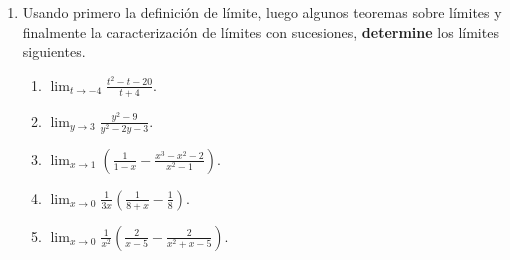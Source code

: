 \documentclass[12pt]{article}
\begin{document}
\begin{enumerate}
\begin{proof}
        De (ii): 
    \end{proof}

    \item Usando primero la definición de límite, luego algunos teoremas sobre límites y finalmente la caracterización de límites con sucesiones, \textbf{determine} los límites siguientes.
    \begin{enumerate}
        \item $\lim_{t\rightarrow-4}\frac{t^2-t-20}{t+4}$.
        \item $\lim_{y\rightarrow3}\frac{y^2-9}{y^2-2y-3}$.
        \item $\lim_{x\rightarrow1}\left(\frac{1}{1-x}-\frac{x^3-x^2-2}{x^2-1}\right)$.
        \item $\lim_{x\rightarrow0}\frac{1}{3x}\left(\frac{1}{8+x}-\frac{1}{8}\right)$.
        \item $\lim_{x\rightarrow0}\frac{1}{x^2}\left(\frac{2}{x-5}-\frac{2}{x^2+x-5} \right)$.
    \end{enumerate}


\end{enumerate}
\end{document}
